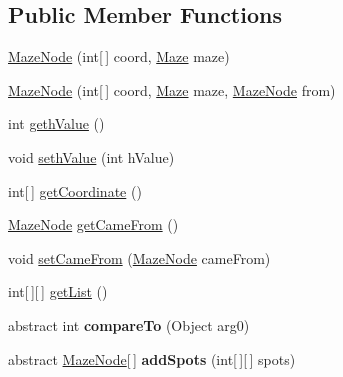 \subsection*{Public Member Functions}
\begin{DoxyCompactItemize}
\item 
\hyperlink{classcs242_1_1johnst26_1_1maze_solver_1_1impl_1_1pqueue_1_1_maze_node_a90e6a7193d61dab60828d06f0d464722}{Maze\-Node} (int\mbox{[}$\,$\mbox{]} coord, \hyperlink{interfacecs242_1_1johnst26_1_1maze_1_1_maze}{Maze} maze)
\item 
\hyperlink{classcs242_1_1johnst26_1_1maze_solver_1_1impl_1_1pqueue_1_1_maze_node_a0f7ff5373f63aada31b553ba06a78c81}{Maze\-Node} (int\mbox{[}$\,$\mbox{]} coord, \hyperlink{interfacecs242_1_1johnst26_1_1maze_1_1_maze}{Maze} maze, \hyperlink{classcs242_1_1johnst26_1_1maze_solver_1_1impl_1_1pqueue_1_1_maze_node}{Maze\-Node} from)
\item 
int \hyperlink{classcs242_1_1johnst26_1_1maze_solver_1_1impl_1_1pqueue_1_1_maze_node_a0301c46e202abce1d076b5cde4c2e2b2}{geth\-Value} ()
\item 
void \hyperlink{classcs242_1_1johnst26_1_1maze_solver_1_1impl_1_1pqueue_1_1_maze_node_ad3a0a461d41ce330bc7b3732e7c0151d}{seth\-Value} (int h\-Value)
\item 
int\mbox{[}$\,$\mbox{]} \hyperlink{classcs242_1_1johnst26_1_1maze_solver_1_1impl_1_1pqueue_1_1_maze_node_a80ac52f500d5266b83f91dc1e144d484}{get\-Coordinate} ()
\item 
\hyperlink{classcs242_1_1johnst26_1_1maze_solver_1_1impl_1_1pqueue_1_1_maze_node}{Maze\-Node} \hyperlink{classcs242_1_1johnst26_1_1maze_solver_1_1impl_1_1pqueue_1_1_maze_node_a7be7c45041aca1f8eb171d809e280602}{get\-Came\-From} ()
\item 
void \hyperlink{classcs242_1_1johnst26_1_1maze_solver_1_1impl_1_1pqueue_1_1_maze_node_ac290d0e521fdb9f201b8e6f6cb5b310d}{set\-Came\-From} (\hyperlink{classcs242_1_1johnst26_1_1maze_solver_1_1impl_1_1pqueue_1_1_maze_node}{Maze\-Node} came\-From)
\item 
int\mbox{[}$\,$\mbox{]}\mbox{[}$\,$\mbox{]} \hyperlink{classcs242_1_1johnst26_1_1maze_solver_1_1impl_1_1pqueue_1_1_maze_node_adfff4b876fbcd79be24d0fdc3c02d5d2}{get\-List} ()
\item 
\hypertarget{classcs242_1_1johnst26_1_1maze_solver_1_1impl_1_1pqueue_1_1_maze_node_ae0a38c9fb43d30861b35a1ea6f9127a0}{abstract int {\bfseries compare\-To} (Object arg0)}\label{classcs242_1_1johnst26_1_1maze_solver_1_1impl_1_1pqueue_1_1_maze_node_ae0a38c9fb43d30861b35a1ea6f9127a0}

\item 
\hypertarget{classcs242_1_1johnst26_1_1maze_solver_1_1impl_1_1pqueue_1_1_maze_node_aa8b13493273d8859fe88ebbf275d350d}{abstract \hyperlink{classcs242_1_1johnst26_1_1maze_solver_1_1impl_1_1pqueue_1_1_maze_node}{Maze\-Node}\mbox{[}$\,$\mbox{]} {\bfseries add\-Spots} (int\mbox{[}$\,$\mbox{]}\mbox{[}$\,$\mbox{]} spots)}\label{classcs242_1_1johnst26_1_1maze_solver_1_1impl_1_1pqueue_1_1_maze_node_aa8b13493273d8859fe88ebbf275d350d}

\end{DoxyCompactItemize}
